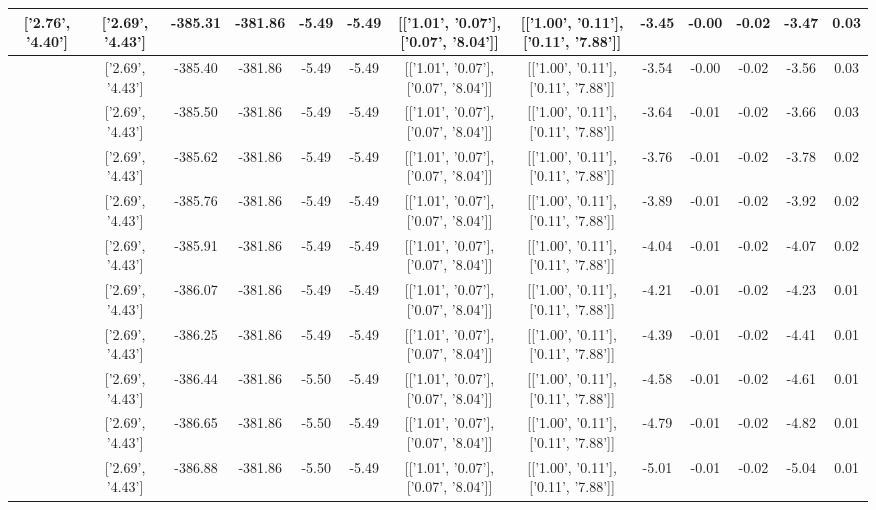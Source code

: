 \begin{table}[htbp]
\begin{adjustbox}{angle=90}
\begin{tabular}{|c|c|c|c|c|c|c|c|c|c|c|c|c|}
 ['2.76', '4.40'] & ['2.69', '4.43'] & -385.31 & -381.86 & -5.49 & -5.49 & [['1.01', '0.07'], ['0.07', '8.04']] & [['1.00', '0.11'], ['0.11', '7.88']] & -3.45 & -0.00 & -0.02 & -3.47 & 0.03\\ \hline
 ['2.77', '4.39'] & ['2.69', '4.43'] & -385.40 & -381.86 & -5.49 & -5.49 & [['1.01', '0.07'], ['0.07', '8.04']] & [['1.00', '0.11'], ['0.11', '7.88']] & -3.54 & -0.00 & -0.02 & -3.56 & 0.03\\ \hline
 ['2.79', '4.39'] & ['2.69', '4.43'] & -385.50 & -381.86 & -5.49 & -5.49 & [['1.01', '0.07'], ['0.07', '8.04']] & [['1.00', '0.11'], ['0.11', '7.88']] & -3.64 & -0.01 & -0.02 & -3.66 & 0.03\\ \hline
 ['2.80', '4.38'] & ['2.69', '4.43'] & -385.62 & -381.86 & -5.49 & -5.49 & [['1.01', '0.07'], ['0.07', '8.04']] & [['1.00', '0.11'], ['0.11', '7.88']] & -3.76 & -0.01 & -0.02 & -3.78 & 0.02\\ \hline
 ['2.81', '4.37'] & ['2.69', '4.43'] & -385.76 & -381.86 & -5.49 & -5.49 & [['1.01', '0.07'], ['0.07', '8.04']] & [['1.00', '0.11'], ['0.11', '7.88']] & -3.89 & -0.01 & -0.02 & -3.92 & 0.02\\ \hline
 ['2.82', '4.37'] & ['2.69', '4.43'] & -385.91 & -381.86 & -5.49 & -5.49 & [['1.01', '0.07'], ['0.07', '8.04']] & [['1.00', '0.11'], ['0.11', '7.88']] & -4.04 & -0.01 & -0.02 & -4.07 & 0.02\\ \hline
 ['2.84', '4.36'] & ['2.69', '4.43'] & -386.07 & -381.86 & -5.49 & -5.49 & [['1.01', '0.07'], ['0.07', '8.04']] & [['1.00', '0.11'], ['0.11', '7.88']] & -4.21 & -0.01 & -0.02 & -4.23 & 0.01\\ \hline
 ['2.85', '4.36'] & ['2.69', '4.43'] & -386.25 & -381.86 & -5.49 & -5.49 & [['1.01', '0.07'], ['0.07', '8.04']] & [['1.00', '0.11'], ['0.11', '7.88']] & -4.39 & -0.01 & -0.02 & -4.41 & 0.01\\ \hline
 ['2.86', '4.35'] & ['2.69', '4.43'] & -386.44 & -381.86 & -5.50 & -5.49 & [['1.01', '0.07'], ['0.07', '8.04']] & [['1.00', '0.11'], ['0.11', '7.88']] & -4.58 & -0.01 & -0.02 & -4.61 & 0.01\\ \hline
 ['2.87', '4.34'] & ['2.69', '4.43'] & -386.65 & -381.86 & -5.50 & -5.49 & [['1.01', '0.07'], ['0.07', '8.04']] & [['1.00', '0.11'], ['0.11', '7.88']] & -4.79 & -0.01 & -0.02 & -4.82 & 0.01\\ \hline
 ['2.89', '4.34'] & ['2.69', '4.43'] & -386.88 & -381.86 & -5.50 & -5.49 & [['1.01', '0.07'], ['0.07', '8.04']] & [['1.00', '0.11'], ['0.11', '7.88']] & -5.01 & -0.01 & -0.02 & -5.04 & 0.01\\ \hline

\end{tabular}
\end{adjustbox}
\end{table}
